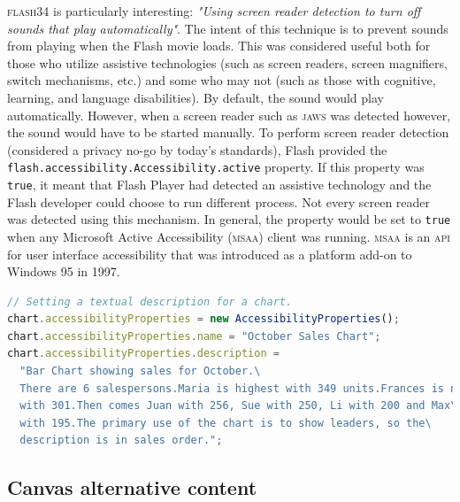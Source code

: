 \documentclass[sigconf]{acmart}
\begin{document}
\textsc{flash}34 is particularly interesting: \textit{"Using screen reader detection to turn off sounds that play automatically"}. The intent of this technique is to prevent sounds from playing when the Flash movie loads. This was considered useful both for those who utilize assistive technologies (such as screen readers, screen magnifiers, switch mechanisms, etc.) and some who may not (such as those with cognitive, learning, and language disabilities). By default, the sound would play automatically. However, when a screen reader such as \textsc{jaws} was detected however, the sound would have to be started manually. To perform screen reader detection (considered a privacy no-go by today's standards), Flash provided the \texttt{flash.accessibility.Accessibility.active} property. If this property was \texttt{true}, it meant that Flash Player had detected an assistive technology and the Flash developer could choose to run different process. Not every screen reader was detected using this mechanism. In general, the property would be set to \texttt{true} when any Microsoft Active Accessibility (\textsc{msaa}) client was running. \textsc{msaa} is an \textsc{api} for user interface accessibility that was introduced as a platform add-on to Windows 95 in 1997. 

\begin{lstlisting}[language=JavaScript, style=ES6, label={lst:flash}, caption={Setting the description property for a non-text object in Flash (\textsc{flash}2)}]
// Setting a textual description for a chart.
chart.accessibilityProperties = new AccessibilityProperties();
chart.accessibilityProperties.name = "October Sales Chart";
chart.accessibilityProperties.description =
  "Bar Chart showing sales for October.\
  There are 6 salespersons.Maria is highest with 349 units.Frances is next\
  with 301.Then comes Juan with 256, Sue with 250, Li with 200 and Max\
  with 195.The primary use of the chart is to show leaders, so the\
  description is in sales order.";
\end{lstlisting}

\subsection{Canvas alternative content}
\end{document}
